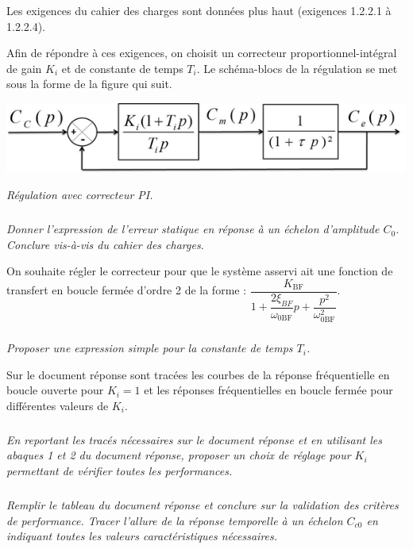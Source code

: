 \documentclass[10pt,fleqn]{article} %
\begin{document}
Les exigences du cahier des charges sont données plus haut (exigences 1.2.2.1 à 1.2.2.4).

Afin de répondre à ces exigences, on choisit un correcteur proportionnel-intégral de gain $K_i$ et de constante de temps $T_i$. Le schéma-blocs de la régulation se met sous la forme de la figure qui suit.

\begin{center}
\includegraphics[width=.55\linewidth]{images/Sujet/images/fig_08}

\textit{Régulation avec correcteur PI.}
\end{center}


\subparagraph{}
\textit{Donner l’expression de l’erreur statique en réponse à un échelon d'amplitude $C_0$. Conclure vis-à-vis du cahier des charges.}
\ifprof
\begin{corrige}
\end{corrige}
\else
\fi

\vspace{.25cm}

On souhaite régler le correcteur pour que le système asservi ait une fonction de transfert en boucle fermée
d’ordre 2 de la forme :
$\dfrac{K_{\text{BF}}}{1+\dfrac{2\xi_{BF}}{\omega_{0\text{BF}}}p+\dfrac{p^2}{\omega_{0\text{BF}}^2}}$.


\subparagraph{}
\textit{Proposer une expression simple pour la constante de temps $T_i$.}
\ifprof
\begin{corrige}
\end{corrige}
\else
\fi

Sur le document réponse sont tracées les courbes de la réponse fréquentielle en boucle ouverte pour
$K_i=1$ et les réponses fréquentielles en boucle fermée pour différentes valeurs de $K_i$.


\subparagraph{}
\textit{En reportant les tracés nécessaires sur le document réponse et en utilisant les abaques 1 et 2 du
document réponse, proposer un choix de réglage pour $K_i$ permettant de vérifier toutes les
performances.}
\ifprof
\begin{corrige}
\end{corrige}
\else
\fi


\subparagraph{}
\textit{Remplir le tableau du document réponse et conclure sur la validation des critères de performance.
Tracer l’allure de la réponse temporelle à un échelon $C_{c0}$ en indiquant toutes les valeurs caractéristiques
nécessaires.}
\end{document}
